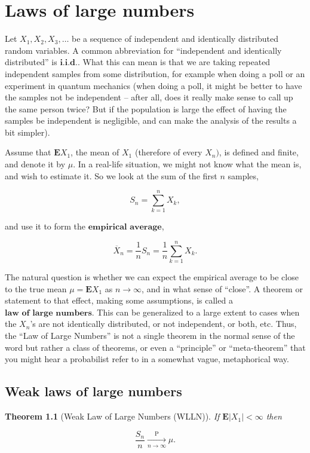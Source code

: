 \documentclass[11pt]{report}
\theoremstyle{plain}
\newtheorem{thm}{Theorem}[chapter]
\theoremstyle{definition}
\begin{document}
\chapter{Laws of large numbers}

Let $X_1, X_2, X_3, \ldots$ be a sequence of
independent and identically distributed random
variables. A common abbreviation for ``independent and
identically distributed'' is $\textbf{i.i.d.}$. What
this can mean is that we are taking repeated
independent samples from some distribution, for
example when doing a poll or an experiment in quantum
mechanics (when doing a poll, it might be better to
have the samples not be independent -- after all, does
it really make sense to call up the same person twice?
But if the population is large the effect of having
the samples be independent is negligible, and can make
the analysis of the results a bit simpler).

Assume that $\mathbf{E} X_1$, the mean of $X_1$
(therefore of every $X_n)$, is defined and finite,
and denote it by $\mu$. In a real-life situation, we
might not know what the mean is, and wish to estimate
it. So we look at the sum of the first $n$ samples,

\[
S_n = \sum_{k=1}^n X_k,
\]

\noindent and use it to form the $\textbf{empirical average}$,

\[
\overline{X}_n = \frac1n S_n = \frac{1}{n} \sum_{k=1}^n X_k.
\]

\noindent The natural question is whether we can expect the
empirical average to be close to the true mean
$\mu=\mathbf{E} X_1$ as $n\to\infty$, and in what
sense of ``close''. A theorem or statement to that
effect, making some assumptions, is called a
$\textbf{law of large numbers}$. This can be
generalized to a large extent to cases when the
$X_n$'s are not identically distributed, or not
independent, or both, etc. Thus, the ``Law of Large
Numbers'' is not a single theorem in the normal sense
of the word but rather a class of theorems, or even a
``principle'' or ``meta-theorem'' that you might hear
a probabilist refer to in a somewhat vague,
metaphorical way.

\section{Weak laws of large numbers}

\begin{thm}[Weak Law of Large Numbers (WLLN)]
\label{thm-wlln}
If $\mathbf{E}|X_1|<\infty$ then

\[
\frac{S_n}{n} \xrightarrow[n\to\infty]{\mathrm{P}} \mu.
\]

\end{thm}
\end{document}
